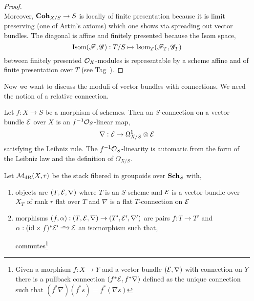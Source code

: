 \documentclass[12pt]{article}
\begin{document}
\begin{proof}
\bigskip\\
Moreover, $\mathbf{Coh}_{X/S} \to S$ is locally of finite presentation because it is limit preserving (one of Artin's axioms) which one shows via spreading out vector bundles. The diagonal is affine and finitely presented because the Isom space,
\[ \mathrm{Isom}(\mathscr{F}, \mathscr{G}) : T/S \mapsto \mathrm{Isom}_{T}(\mathscr{F}_T, \mathscr{G}_T) \]
between finitely presented $\mathcal{O}_{X}$-modules is representable by a scheme affine and of finite presentation over $T$ (see Tag~).
\end{proof}

Now we want to discuss the moduli of vector bundles with connections. We need the notion of a relative connection.

\begin{defn}
Let $f : X \to S$ be a morphism of schemes. Then an $S$-connection on a vector bundle $\mathcal{E}$ over $X$ is an $f^{-1} \mathcal{O}_{S}$-linear map,
\[ \nabla : \mathcal{E} \to \Omega^1_{X/S} \otimes \mathcal{E} \]
satisfying the Leibniz rule. The $f^{-1} \mathcal{O}_{S}$-linearity is automatic from the form of the Leibniz law and the definition of $\Omega_{X/S}$.
\end{defn}

\begin{defn}
Let $\mathcal{M}_{\mathrm{dR}}(X, r)$ be the stack fibered in groupoids over $\mathbf{Sch}_S$ with,
\begin{enumerate}
\item objects are $(T, \mathcal{E}, \nabla)$ where $T$ is an $S$-scheme and $\mathcal{E}$ is a vector bundle over $X_T$ of rank $r$ flat over $T$ and $\nabla$ is a flat $T$-connection on $\mathcal{E}$
\item morphisms $(f, \alpha) : (T, \mathcal{E}, \nabla) \to (T', \mathcal{E}', \nabla')$ are pairs $f : T \to T'$ and $\alpha : (\id \times f)^* \E' \iso \E$ an isomorphism such that,
\begin{center}
\end{center}
commutes\footnote{Given a morphism $f : X \to Y$ and a vector bundle $(\mathcal{E}, \nabla)$ with connection on $Y$ there is a pullback connection $(f^* \mathcal{E}, f^* \nabla)$ defined as the unique connection such that $(f^* \nabla) (f^* s) = f^* (\nabla s)$ }
\end{enumerate}
\end{defn}
\end{document}
